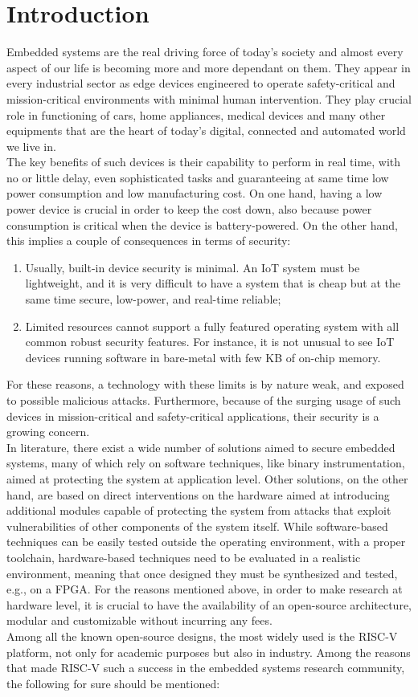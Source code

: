 \chapter{Introduction}
Embedded systems are the real driving force of today's society and almost every aspect of our life is becoming more and more dependant on them. They appear in every industrial sector as edge devices engineered to operate safety-critical and mission-critical environments with minimal human intervention. They play crucial role in functioning of cars, home appliances, medical devices and many other equipments that are the heart of today's digital, connected and automated world we live in.\\
The key benefits of such devices is their capability to perform in real time, with no or little delay, even sophisticated tasks and guaranteeing at same time low power consumption and low manufacturing cost.
On one hand, having a low power device is crucial in order to keep the cost down, also because power consumption is critical when the device is battery-powered. On the other hand, this implies a couple of consequences in terms of security:
\begin{enumerate}
\item Usually, built-in device security is minimal. An IoT system must be lightweight, and it is very difficult to have a system that is cheap but at the same time secure, low-power, and real-time reliable;
\item Limited resources cannot support a fully featured operating system with all common robust security features. For instance, it is not unusual to see IoT devices running software in bare-metal with few KB of on-chip memory.
\end{enumerate}
For these reasons, a technology with these limits is by nature weak, and exposed to possible malicious attacks. Furthermore, because of the surging usage of such devices in mission-critical and safety-critical applications, their security is a growing concern.\\
In literature, there exist a wide number of solutions aimed to secure embedded systems, many of which rely on software techniques, like binary instrumentation, aimed at protecting the system at application level. Other solutions, on the other hand, are based on direct interventions on the hardware aimed at introducing additional modules capable of protecting the system from attacks that exploit vulnerabilities of other components of the system itself. While software-based techniques can be easily tested outside the operating environment, with a proper toolchain, hardware-based techniques need to be evaluated in a realistic environment, meaning that once designed they must be synthesized and tested, e.g., on a FPGA. For the reasons mentioned above, in order to make research at hardware level, it is crucial to have the availability of an open-source architecture, modular and customizable without incurring any fees.\\
Among all the known open-source designs, the most widely used is the RISC-V platform, not only for academic purposes but also in industry. Among the reasons that made RISC-V such a success in the embedded systems research community, the following for sure should be mentioned:

